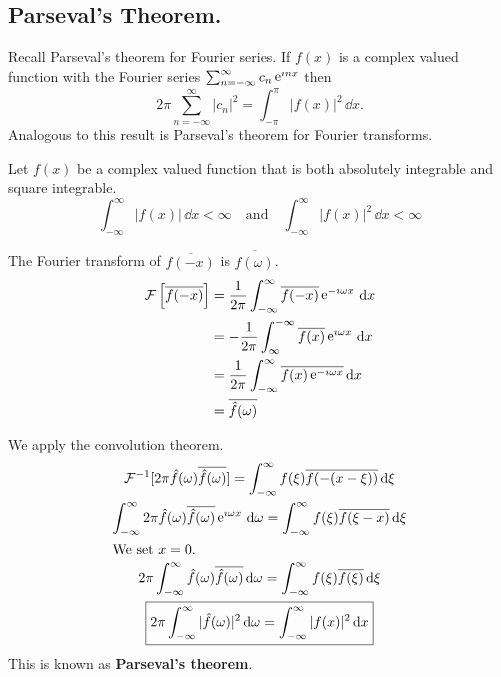 





















\subsection{Parseval's Theorem.}




Recall Parseval's theorem for Fourier series.  If $f(x)$ is a complex
valued function with the Fourier series $\sum_{n = - \infty}^\infty c_n \mathop{\mathrm{e}}\nolimits^{\imath n x}$ then
\[ 
2 \pi \sum_{n = - \infty}^\infty |c_n|^2 = \int_{-\pi}^\pi |f(x)|^2\,\dd x. 
\]
Analogous to this result is Parseval's theorem for Fourier transforms.

Let $f(x)$ be a complex valued function that is both absolutely integrable
and square integrable.
\[ 
\int_{-\infty}^\infty |f(x)|\,\dd x < \infty \quad \mathrm{and} \quad
\int_{-\infty}^\infty |f(x)|^2 \,\dd x < \infty
\]

The Fourier transform of $\overline{f(-x)}$ is $\overline{\hat{f}(\omega)}$.
\begin{align*}
  \mathcal{F}\left[\overline{f(-x)}\right]
  &= \frac{1}{2\pi} \int_{-\infty}^\infty \overline{f(-x)} \mathop{\mathrm{e}}\nolimits^{-\imath \omega x} \,\mathrm{d} x 
  \\
  &= - \frac{1}{2\pi} \int_\infty^{-\infty} \overline{f(x)} \mathop{\mathrm{e}}\nolimits^{\imath \omega x} \,\mathrm{d} x 
  \\
  &= \frac{1}{2\pi} \int_{-\infty}^\infty \overline{f(x) \mathop{\mathrm{e}}\nolimits^{-\imath \omega x}} \,\mathrm{d} x 
  \\
  &= \overline{\hat{f}(\omega)}
\end{align*}

We apply the convolution theorem.
\begin{gather*}
  \mathcal{F}^{-1} [2\pi \hat{f}(\omega) \overline{\hat{f}(\omega)}] = 
  \int_{-\infty}^\infty f(\xi) \overline{f(-(x-\xi))}\,\mathrm{d} \xi 
  \\
  \int_{-\infty}^\infty 2 \pi \hat{f}(\omega) \overline{\hat{f}(\omega)} \mathop{\mathrm{e}}\nolimits^{\imath \omega x}\,\mathrm{d} \omega
  = \int_{-\infty}^\infty f(\xi) \overline{f(\xi-x)}\,\mathrm{d} \xi
  \\
  \intertext{We set $x=0$.}
  2 \pi \int_{-\infty}^\infty \hat{f}(\omega) \overline{\hat{f}(\omega)} \,\mathrm{d} \omega
  = \int_{-\infty}^\infty f(\xi) \overline{f(\xi)}\,\mathrm{d} \xi 
  \\
  \boxed{ 
    2 \pi \int_{-\infty}^\infty |\hat{f}(\omega)|^2\,\mathrm{d} \omega = \int_{-\infty}^\infty |f(x)|^2\,\mathrm{d} x
    }
\end{gather*}
This is known as \textbf{Parseval's theorem}.







